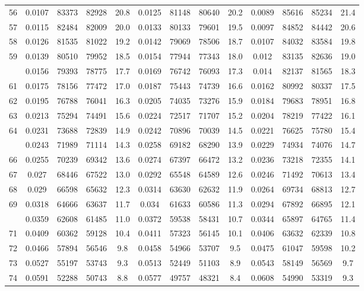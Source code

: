 \documentclass[
  14pt,
]{article}
\begin{document}
\begin{longtable}[t]{lcccccccccccc}
56 & 0.0107 & 83373 & 82928 & 20.8 & 0.0125 & 81148 & 80640 & 20.2 & 0.0089 & 85616 & 85234 & 21.4\\
57 & 0.0115 & 82484 & 82009 & 20.0 & 0.0133 & 80133 & 79601 & 19.5 & 0.0097 & 84852 & 84442 & 20.6\\
58 & 0.0126 & 81535 & 81022 & 19.2 & 0.0142 & 79069 & 78506 & 18.7 & 0.0107 & 84032 & 83584 & 19.8\\
59 & 0.0139 & 80510 & 79952 & 18.5 & 0.0154 & 77944 & 77343 & 18.0 & 0.012 & 83135 & 82636 & 19.0\\
\addlinespace
60 & 0.0156 & 79393 & 78775 & 17.7 & 0.0169 & 76742 & 76093 & 17.3 & 0.014 & 82137 & 81565 & 18.3\\
61 & 0.0175 & 78156 & 77472 & 17.0 & 0.0187 & 75443 & 74739 & 16.6 & 0.0162 & 80992 & 80337 & 17.5\\
62 & 0.0195 & 76788 & 76041 & 16.3 & 0.0205 & 74035 & 73276 & 15.9 & 0.0184 & 79683 & 78951 & 16.8\\
63 & 0.0213 & 75294 & 74491 & 15.6 & 0.0224 & 72517 & 71707 & 15.2 & 0.0204 & 78219 & 77422 & 16.1\\
64 & 0.0231 & 73688 & 72839 & 14.9 & 0.0242 & 70896 & 70039 & 14.5 & 0.0221 & 76625 & 75780 & 15.4\\
\addlinespace
65 & 0.0243 & 71989 & 71114 & 14.3 & 0.0258 & 69182 & 68290 & 13.9 & 0.0229 & 74934 & 74076 & 14.7\\
66 & 0.0255 & 70239 & 69342 & 13.6 & 0.0274 & 67397 & 66472 & 13.2 & 0.0236 & 73218 & 72355 & 14.1\\
67 & 0.027 & 68446 & 67522 & 13.0 & 0.0292 & 65548 & 64589 & 12.6 & 0.0246 & 71492 & 70613 & 13.4\\
68 & 0.029 & 66598 & 65632 & 12.3 & 0.0314 & 63630 & 62632 & 11.9 & 0.0264 & 69734 & 68813 & 12.7\\
69 & 0.0318 & 64666 & 63637 & 11.7 & 0.034 & 61633 & 60586 & 11.3 & 0.0294 & 67892 & 66895 & 12.1\\
\addlinespace
70 & 0.0359 & 62608 & 61485 & 11.0 & 0.0372 & 59538 & 58431 & 10.7 & 0.0344 & 65897 & 64765 & 11.4\\
71 & 0.0409 & 60362 & 59128 & 10.4 & 0.0411 & 57323 & 56145 & 10.1 & 0.0406 & 63632 & 62339 & 10.8\\
72 & 0.0466 & 57894 & 56546 & 9.8 & 0.0458 & 54966 & 53707 & 9.5 & 0.0475 & 61047 & 59598 & 10.2\\
73 & 0.0527 & 55197 & 53743 & 9.3 & 0.0513 & 52449 & 51103 & 8.9 & 0.0543 & 58149 & 56569 & 9.7\\
74 & 0.0591 & 52288 & 50743 & 8.8 & 0.0577 & 49757 & 48321 & 8.4 & 0.0608 & 54990 & 53319 & 9.3\\

\end{longtable}
\end{document}
